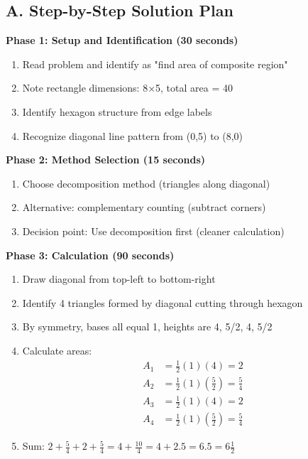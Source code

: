 \documentclass[11pt]{article}
\begin{document}
\begin{roadmapbox}
\subsection*{A. Step-by-Step Solution Plan}

\textbf{Phase 1: Setup and Identification (30 seconds)}
\begin{enumerate}
    \item Read problem and identify as "find area of composite region"
    \item Note rectangle dimensions: 8×5, total area = 40
    \item Identify hexagon structure from edge labels
    \item Recognize diagonal line pattern from (0,5) to (8,0)
\end{enumerate}

\textbf{Phase 2: Method Selection (15 seconds)}
\begin{enumerate}
    \item Choose decomposition method (triangles along diagonal)
    \item Alternative: complementary counting (subtract corners)
    \item Decision point: Use decomposition first (cleaner calculation)
\end{enumerate}

\textbf{Phase 3: Calculation (90 seconds)}
\begin{enumerate}
    \item Draw diagonal from top-left to bottom-right
    \item Identify 4 triangles formed by diagonal cutting through hexagon
    \item By symmetry, bases all equal 1, heights are 4, 5/2, 4, 5/2
    \item Calculate areas:
        \begin{align*}
        A_1 &= \frac{1}{2}(1)(4) = 2\\
        A_2 &= \frac{1}{2}(1)\left(\frac{5}{2}\right) = \frac{5}{4}\\
        A_3 &= \frac{1}{2}(1)(4) = 2\\
        A_4 &= \frac{1}{2}(1)\left(\frac{5}{2}\right) = \frac{5}{4}
        \end{align*}
    \item Sum: $2 + \frac{5}{4} + 2 + \frac{5}{4} = 4 + \frac{10}{4} = 4 + 2.5 = 6.5 = 6\frac{1}{2}$
\end{enumerate}


\end{roadmapbox}
\end{document}
